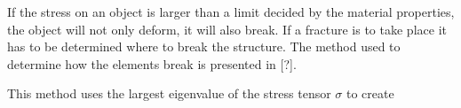 If the stress on an object is larger than a limit decided by the material properties, the object will not only deform, it will also break. If a fracture is to take place it has to be determined where to break the structure. The method used to determine how the elements break is presented in [?].

This method uses the largest eigenvalue of the stress tensor $\sigma$ to create 
